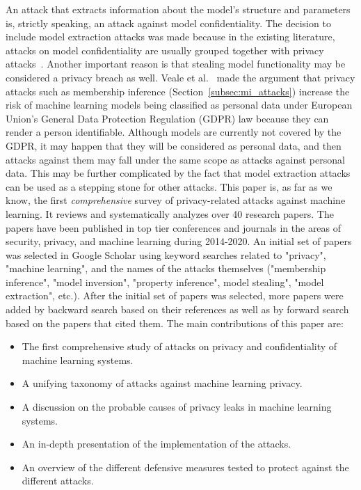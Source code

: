 An attack that extracts information about the model's structure and parameters is, strictly speaking, an attack against model confidentiality. The decision to include model extraction attacks was made because in the existing literature, attacks on model confidentiality are usually grouped together with privacy attacks~. Another important reason is that stealing model functionality may be considered a privacy breach as well. Veale et al.~ made the argument that privacy attacks such as membership inference (Section~\ref{subsec:mi_attacks}) increase the risk of machine learning models being classified as personal data under European Union's General Data Protection Regulation (GDPR) law because they can render a person identifiable. Although models are currently not covered by the GDPR, it may happen that they will be considered as personal data, and then attacks against them may fall under the same scope as attacks against personal data. This may be further complicated by the fact that model extraction attacks can be used as a stepping stone for other attacks. 
This paper is, as far as we know, the first \emph{comprehensive} survey of privacy-related attacks against machine learning. It reviews and systematically analyzes over 40 research papers. The papers have been published in top tier conferences and journals in the areas of security, privacy, and machine learning during 2014-2020. An initial set of papers was selected in Google Scholar using keyword searches related to "privacy", "machine learning", and the names of the attacks themselves ("membership inference", "model inversion", "property inference", model stealing", "model extraction", etc.). After the initial set of papers was selected, more papers were added by backward search based on their references as well as by forward search based on the papers that cited them.
The main contributions of this paper are:
\begin{itemize}
    \item The first comprehensive study of attacks on privacy and confidentiality of machine learning systems. 
    \item A unifying taxonomy of attacks against machine learning privacy.
    \item A discussion on the probable causes of privacy leaks in machine learning systems.
    \item An in-depth presentation of the implementation of the attacks.
    \item An overview of the different defensive measures tested to protect against the different attacks.
\end{itemize}

